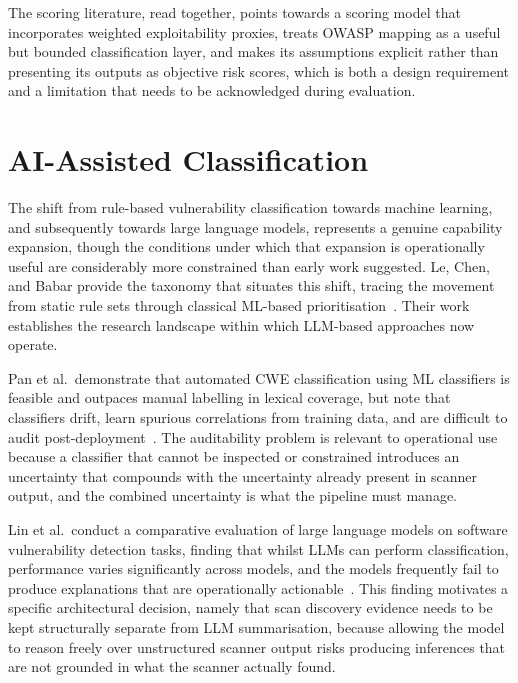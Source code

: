 \documentclass[12pt, a4paper, oneside]{report}
\begin{document}
The scoring literature, read together, points towards a scoring model
that incorporates weighted exploitability proxies, treats OWASP mapping
as a useful but bounded classification layer, and makes its assumptions
explicit rather than presenting its outputs as objective risk scores,
which is both a design requirement and a limitation that needs to be
acknowledged during evaluation.

\section{AI-Assisted Classification}

The shift from rule-based vulnerability classification towards machine
learning, and subsequently towards large language models, represents a
genuine capability expansion, though the conditions under which that
expansion is operationally useful are considerably more constrained than
early work suggested. Le, Chen, and Babar provide the taxonomy that
situates this shift, tracing the movement from static rule sets through
classical ML-based prioritisation~\cite{le2022}. Their work establishes
the research landscape within which LLM-based approaches now operate.

Pan et al.\ demonstrate that automated CWE classification using ML
classifiers is feasible and outpaces manual labelling in lexical
coverage, but note that classifiers drift, learn spurious correlations
from training data, and are difficult to audit post-deployment~\cite{pan2023}.
The auditability problem is relevant to operational use because a
classifier that cannot be inspected or constrained introduces an
uncertainty that compounds with the uncertainty already present in
scanner output, and the combined uncertainty is what the pipeline must
manage.

Lin et al.\ conduct a comparative evaluation of large language models on
software vulnerability detection tasks, finding that whilst LLMs can
perform classification, performance varies significantly across models,
and the models frequently fail to produce explanations that are
operationally actionable~\cite{lin2025}. This finding motivates a
specific architectural decision, namely that scan discovery evidence
needs to be kept structurally separate from LLM summarisation, because
allowing the model to reason freely over unstructured scanner output
risks producing inferences that are not grounded in what the scanner
actually found.
\end{document}
